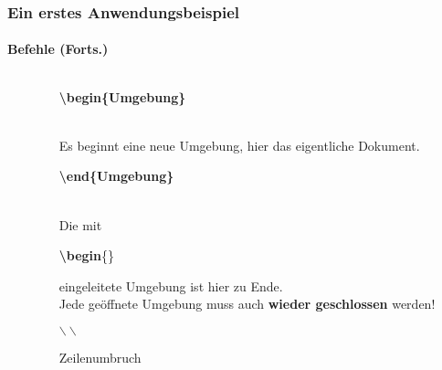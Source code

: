 \begin{frame}
\frametitle{Ein erstes Anwendungsbeispiel}
\framesubtitle{Befehle (Forts.)}
\begin{columns}
\begin{column}{0.55\textwidth}
\begin{ttfamily}\footnotesize

 \normalsize
\end{ttfamily}
\end{column}
\begin{column}{0.45\textwidth}
\begin{ttfamily}\textbf{\color{unibablueI}\textbackslash begin\color{black}\{Umgebung\}}\end{ttfamily}\\
Es beginnt eine neue Umgebung, hier das eigentliche Dokument.\\[5mm]

\begin{ttfamily}\textbf{\color{unibablueI}\textbackslash end\color{black}\{Umgebung\}}\end{ttfamily}\\
Die mit \begin{ttfamily}\textbf{\color{unibablueI}\textbackslash begin}\color{black}\{\}\end{ttfamily}
eingeleitete Umgebung ist hier zu Ende.\\
Jede geöffnete Umgebung muss auch \textbf{wieder geschlossen} werden!
\\[5mm]

\begin{ttfamily}\textbf{\color{nounibaredII}$\backslash\backslash$}\color{black}\end{ttfamily} Zeilenumbruch\\
\end{column}
\end{columns}
\end{frame}



